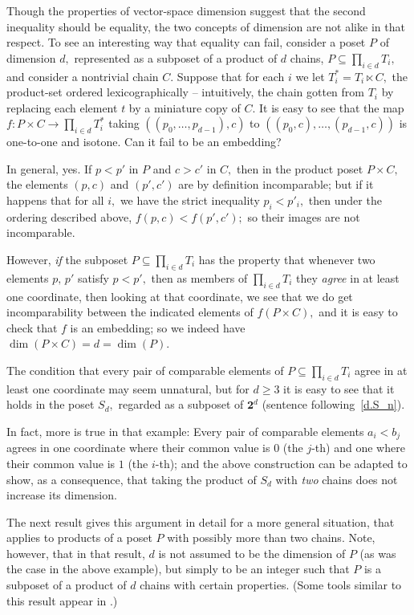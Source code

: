 \documentclass{amsart}
\numberwithin{equation}{section}
\numberwithin{theorem}{section}
\newcommand{\2}{\mathbf{2}}
\begin{document}
Though the properties of vector-space dimension
suggest that the second inequality
should be equality, the two concepts of dimension
are not alike in that respect.
To see an interesting
way that equality can fail, consider a poset $P$ of
dimension $d,$ represented as a subposet of a
product of $d$ chains, $P\subseteq \prod_{i\in d} T_i,$
and consider a nontrivial chain $C.$
Suppose that for each $i$ we let $T^*_i = T_i\ltimes C,$
the product-set ordered
lexicographically -- intuitively, the chain gotten from $T_i$ by
replacing each element $t$ by a miniature copy of $C.$
It is easy to see that the map $f:P\times C\to\prod_{i\in d} T^*_i$
taking $((p_0,\dots,p_{d-1}),c)$ to $((p_0,c),\dots,(p_{d-1},c))$
is one-to-one and isotone.
Can it fail to be an embedding?

In general, yes.
If $p< p'$ in $P$ and $c> c'$ in $C,$ then in the
product poset $P\times C,$
the elements $(p,c)$ and $(p',c')$ are by definition incomparable;
but if it happens that for all $i,$ we have the strict
inequality $p_i < p'_i,$
then under the ordering described above, $f(p,c)< f(p',c');$
so their images are not incomparable.

However, {\em if} the subposet $P\subseteq \prod_{i\in d} T_i$
has the property that whenever two elements $p,\,p'$ satisfy
$p<p',$ then as members of $\prod_{i\in d} T_i$ they
{\em agree} in at least one coordinate,
then looking at that coordinate, we see that we do get
incomparability between the indicated elements of $f(P\times C),$
and it is easy to check that $f$ is an embedding; so
we indeed have $\dim(P\times C)=d = \dim(P).$

The condition that every pair of comparable elements
of $P\subseteq \prod_{i\in d} T_i$ agree
in at least one coordinate may seem unnatural, but
for $d\geq 3$ it is easy to see that it holds in the poset $S_d,$
regarded as a subposet of $\2^d$ (sentence
following~\eqref{d.S_n}).

In fact, more is true in that example: Every pair of comparable
elements $a_i<b_j$ agrees in one coordinate where their common
value is $0$ (the $\!j\!$-th)
and one where their common value is $1$ (the $\!i\!$-th);
and the above construction can be adapted to show, as a
consequence, that taking the product of $S_d$ with {\em two}
chains does not increase its dimension.

The next result gives this argument in detail for a
more general situation, that applies to products
of a poset $P$ with possibly more than two chains.
Note, however, that in that result, $d$ is not assumed to
be the dimension of $P$ (as was the case in the
above example), but simply to be an integer such that
$P$ is a subposet of a product of $d$ chains with certain properties.
(Some tools similar to this result appear in \mbox{\cite[\S3]{F+T+W}.)}
\end{document}
